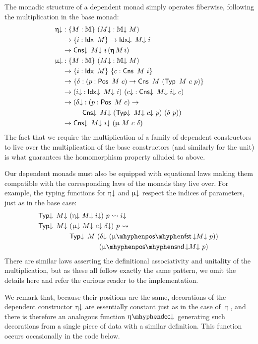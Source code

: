 The monadic structure of a dependent monad simply operates fiberwise,
following the multiplication in the base monad:
\begin{align*}
  \upetad &: \{M : \MM\}\ (M\da : \MMd\ M)\\ 
            &\to \{i : \Idx\ M\} \to \Idxd\ M\da\ i\\ 
            &\to \Cnsd\ M\da\ i\, (\upeta\, M\, i)\\
  \upmud &: \{M : \MM\}\ (M\da : \MMd\ M)\\ 
           &\to \{i : \Idx\ M\}\ \{c : \Cns\ M\ i\} \\
           &\to \{\delta : (p : \Pos\ M\ c) \to \Cns\ M\ (\Typ\ M\ c\ p)\}\\
           &\to (i\da : \Idxd\ M\da\ i)\ (c\da : \Cnsd\ M\da\ i\da\ c)\\
          &\to (\delta\da : (p : \Pos\ M\ c) \to \\
          &\hspace{1cm} \Cnsd\ M\da\ (\Typd\ M\da\ c\da\ p)\ (\delta\ p))\\
           &\to \Cnsd\ M\da\ i\da\ (\upmu\ M\ c\ \delta)
\end{align*}
The fact that we require the multiplication of a family of dependent
constructors to live over the multiplication of the base constructors
(and similarly for the unit) is what guarantees the homomorphism
property alluded to above.

Our dependent monads must also be equipped with equational laws making
them compatible with the corresponding laws of the monads they live
over.  For example, the typing functions for $\upeta{\downarrow}$ and $\upmu{\downarrow}$
respect the indices of parameters, just as in the base case:
\begin{align*}
  \Typd\ M\da\ &(\upetad\ M\da\ i\da)\ p \leadsto i\da\\
  \Typd\ M\da\ &(\upmud\ M\da\ c\da\ \delta\da)\ p \leadsto \\
               &\Typd\ M\ (\delta\da\ (\muposfst\da M\da\ p))\ \\
               &\hspace{1.5cm} (\mupossnd\da M\da\ p)
\end{align*}
There are similar laws asserting the definitional associativity and
unitality of the multiplication, but as these all follow exactly
the same pattern, we omit the details here and refer the curious
reader to the implementation.

We remark that, because their positions are the same, decorations of
the dependent constructor $\upeta{\downarrow}$ are essentially constant just as
in the case of $\upeta$, and there is therefore an analogous function
$\etadecd$ generating such decorations from a single piece of data
with a similar definition.  This function occurs occasionally in the
code below.

